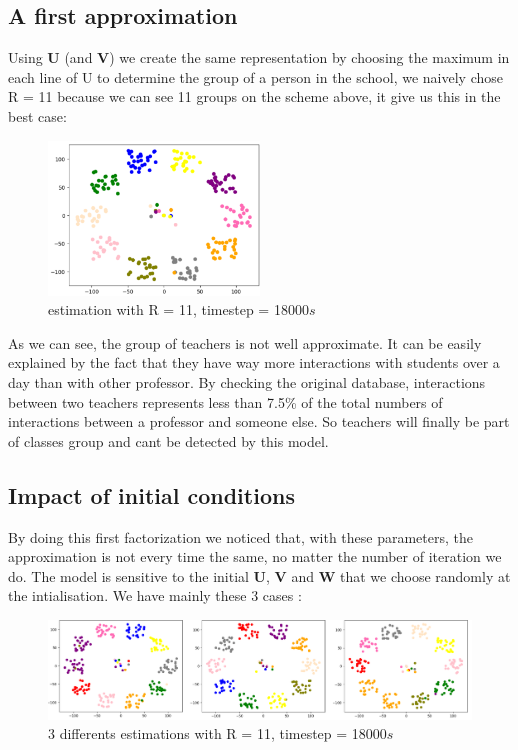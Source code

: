 \documentclass{article}
\begin{document}
\subsection{A first approximation}
Using $\mathbf{U}$ (and $\mathbf{V}$) we create the same representation by choosing the maximum in each line of U to determine the group of a person in the school,
we naively chose R = 11 because we can see 11 groups on the scheme above, it give us this in the best case:

\begin{figure}[h]
    \centering
    \includegraphics[width=0.5\textwidth]{images/naive_approach_r=11_t=18000.png}
    \caption{estimation with R = 11, timestep = 18000$s$}
\end{figure}

As we can see, the group of teachers is not well approximate. It can be easily explained by the fact that they have way more 
interactions with students over a day than with other professor. By checking the original database, interactions between two teachers 
represents less than 7.5\% of the total numbers of interactions between a professor and someone else. 
So teachers will finally be part of classes group and cant be detected by this model.\\

\subsection{Impact of initial conditions}
By doing this first factorization we noticed that, with these parameters, the approximation is not every time the same, 
no matter the number of iteration we do. The model is sensitive to the initial $\mathbf{U}$, $\mathbf{V}$ and $\mathbf{W}$ that we
choose randomly at the intialisation. We have mainly these 3 cases :

\begin{figure}[h]
    \centering
    \includegraphics[width=1\textwidth]{images/3cases_of_convergence.png}
    \caption{3 differents estimations with R = 11, timestep = 18000$s$}
\end{figure}
\end{document}
